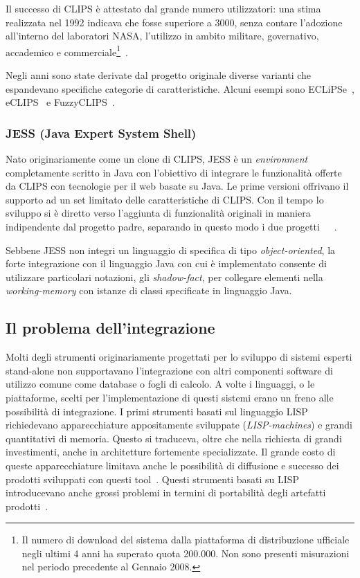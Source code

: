 Il successo di CLIPS è attestato dal grande numero utilizzatori: una stima realizzata nel 1992 indicava che fosse superiore a 3000, senza contare l'adozione all'interno del laboratori NASA, l'utilizzo in ambito militare, governativo, accademico e commerciale\footnote{Il numero di download del sistema dalla piattaforma di distribuzione ufficiale negli ultimi 4 anni ha superato quota 200.000. Non sono presenti misurazioni nel periodo precedente al Gennaio 2008.}~\cite{clipsarch1992}.

Negli anni sono state derivate dal progetto originale diverse varianti che espandevano specifiche categorie di caratteristiche. Alcuni esempi sono ECLiPSe~\cite{haley1991}, eCLIPS~\cite{eclips} e FuzzyCLIPS~\cite{fuzzyclips}.

\subsubsection[JESS]{JESS (Java Expert System Shell)}
Nato originariamente come un clone di CLIPS, JESS è un \emph{environment} completamente scritto in Java con l'obiettivo di integrare le funzionalità offerte da CLIPS con tecnologie per il web basate su Java. 
Le prime versioni offrivano il supporto ad un set limitato delle caratteristiche di CLIPS. Con il tempo lo sviluppo si è diretto verso l'aggiunta di funzionalità originali in maniera indipendente dal progetto padre, separando in questo modo i due progetti~\cite{laerhoven1999}~\cite{jessfaq}~\cite{jessmanual}.

Sebbene JESS non integri un linguaggio di specifica di tipo \emph{object-oriented}, la forte integrazione con il linguaggio Java con cui è implementato consente di utilizzare particolari notazioni, gli \emph{shadow-fact}, per collegare elementi nella \emph{working-memory} con istanze di classi specificate in linguaggio Java.


\subsection{Il problema dell'integrazione}

Molti degli strumenti originariamente progettati per lo sviluppo di sistemi esperti stand-alone non supportavano l'integrazione con altri componenti software di utilizzo comune come database o fogli di calcolo.
A volte i linguaggi, o le piattaforme, scelti per l'implementazione di questi sistemi erano un freno alle possibilità di integrazione. I primi strumenti basati sul linguaggio LISP richiedevano apparecchiature appositamente sviluppate (\emph{LISP-machines}) e grandi quantitativi di memoria. Questo si traduceva, oltre che nella richiesta di grandi investimenti, anche in architetture fortemente specializzate. Il grande costo di queste apparecchiature limitava anche le possibilità di diffusione e successo dei prodotti sviluppati con questi tool~\cite{development1993}.
Questi strumenti basati su LISP introducevano anche grossi problemi in termini di portabilità degli artefatti prodotti~\cite{clipsarch1992}.

